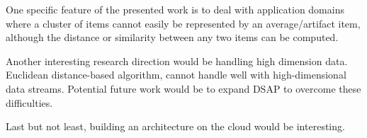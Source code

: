 One specific feature of the presented work is to deal with application domains where a cluster of items cannot easily be represented by an average/artifact item, although the distance or similarity between any two items can be computed. 

Another interesting research direction would be handling high dimension data. Euclidean distance-based algorithm, cannot handle well with high-dimensional data streams. Potential future work would be to expand DSAP to overcome these difficulties.

Last but not least, building an architecture on the cloud would be interesting.


